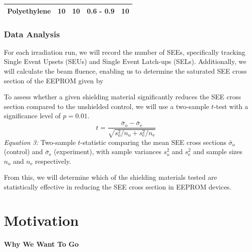 \documentclass{article}
\begin{document}
\begin{table}[h]
\begin{tabular}{@{}lllll@{}}
\multicolumn{1}{l}{Polyethylene}           & \multicolumn{1}{l}{10}                                                               & \multicolumn{1}{l}{10}                       & \multicolumn{1}{l}{0.6 - 0.9}                                                               & \multicolumn{1}{l}{10}                                                                       \\ \bottomrule
\end{tabular}
\end{table}

\section*{Data Analysis}

For each irradiation run, we will record the number of SEEs, specifically tracking Single Event Upsets (SEUs) and Single Event Latch-ups (SELs). 
Additionally, we will calculate the beam fluence, enabling us to determine the saturated SEE cross section of the EEPROM given by 

To assess whether a given shielding material significantly reduces the SEE cross section compared to the unshielded control, we will use a two-sample $t$-test with a significance level of $p = 0.01$.
\begin{equation}
t = \frac{\bar{\sigma}_{\mathrm{o}} - \bar{\sigma}_{\mathrm{e}}}{\sqrt{{s_{\mathrm{o}}^2}/{n_{\mathrm{o}} + {s_{\mathrm{e}}^2}/{n_{\mathrm{e}}}}}} \tag{3}
\end{equation}
\noindent
\textit{Equation 3:} Two-sample $t$-statistic comparing the mean SEE cross sections $\bar{\sigma}_{\mathrm{o}}$ (control) and $\bar{\sigma}_{\mathrm{e}}$ (experiment), with sample variances $s_{\mathrm{o}}^2$ and $s_{\mathrm{e}}^2$ and sample sizes $n_{\mathrm{o}}$ and $n_{\mathrm{e}}$ respectively.

From this, we will determine which of the shielding materials tested are statistically effective in reducing the SEE cross section in EEPROM devices.

\newpage
\vspace*{-5.5em}

\part{Motivation}

\subsection*{Why We Want To Go}
\end{document}

